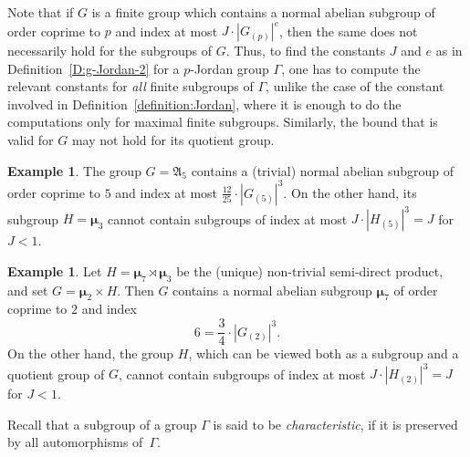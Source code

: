 \documentclass[12pt]{amsart}
\numberwithin{equation}{section}
\theoremstyle{definition}
\newtheorem{example}[subsection]{Example}
\newcommand{\mumu}{\boldsymbol{\mu}}
\begin{document}
Note that if $G$ is a finite group which contains a normal abelian subgroup
of order coprime to $p$ and index at most $J\cdot |G_{(p)}|^e$, then the same
does not necessarily hold for the subgroups of $G$.
Thus, to find the constants $J$ and $e$ as in Definition~\ref{D:g-Jordan-2}
for a $p$-Jordan group $\Gamma$, one has to compute the relevant constants
for \emph{all} finite subgroups of $\Gamma$, unlike the case of the constant involved in
Definition~\ref{definition:Jordan}, where it is enough to do the computations only for
maximal finite subgroups. Similarly, the bound that is valid for $G$ may not hold for its
quotient group.


\begin{example}\label{example:constant-subgroup-1}
The group $G=\mathfrak{A}_5$ contains a
(trivial) normal abelian subgroup of order coprime to $5$ and index at most
$\frac{12}{25}\cdot |G_{(5)}|^3$. On the other hand, its subgroup
$H=\mumu_3$ cannot contain subgroups of index at most
$J\cdot |H_{(5)}|^3=J$ for~\mbox{$J<1$}.
\end{example}

\begin{example}\label{example:constant-subgroup-2}
Let $H=\mumu_7\rtimes \mumu_3$ be the (unique) non-trivial
semi-direct product, and set $G=\mumu_2\times H$.
Then $G$ contains a normal abelian subgroup $\mumu_7$ of order coprime to $2$
and index
$$
6=\frac{3}{4}\cdot |G_{(2)}|^3.
$$
On the other hand, the group
$H$, which can be viewed both as a subgroup and a quotient group
of $G$, cannot contain subgroups of index at most
$J\cdot |H_{(2)}|^3=J$ for $J<1$.
\end{example}


Recall that a subgroup of a group $\Gamma$ is said to be \emph{characteristic},
if it is preserved by all automorphisms of~$\Gamma$.
\end{document}
